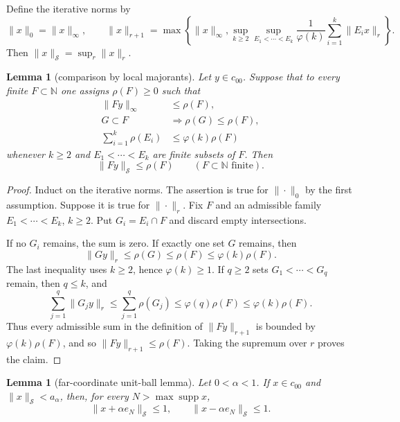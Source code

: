 \documentclass[11pt]{article}
\newtheorem{lemma}[theorem]{Lemma}
\newcommand{\N}{\mathbb N}
\newcommand{\ph}{\varphi}
\DeclareMathOperator{\supp}{supp}
\begin{document}
Define the iterative norms by
\[
 \|x\|_0=\|x\|_\infty,\qquad
 \|x\|_{r+1}=
 \max\left\{\|x\|_\infty,
 \sup_{k\ge 2}\sup_{E_1<\cdots<E_k}
 \frac1{\ph(k)}\sum_{i=1}^k\|E_i x\|_r\right\}.
\]
Then $\|x\|_{\mathcal S}=\sup_r\|x\|_r$.

\begin{lemma}[comparison by local majorants]\label{lem:comparison}
Let $y\in c_{00}$.  Suppose that to every finite $F\subset\N$ one assigns
$\rho(F)\ge 0$ such that
\begin{align*}
 \|Fy\|_\infty&\le \rho(F),\\
 G\subset F&\Longrightarrow \rho(G)\le \rho(F),\\
 \sum_{i=1}^k\rho(E_i)&\le \ph(k)\rho(F)
\end{align*}
whenever $k\ge 2$ and $E_1<\cdots<E_k$ are finite subsets of $F$.  Then
\[
 \|Fy\|_{\mathcal S}\le \rho(F)
 \qquad(F\subset\N\text{ finite}).
\]
\end{lemma}

\begin{proof}
Induct on the iterative norms.  The assertion is true for $\|\cdot\|_0$
by the first assumption.  Suppose it is true for $\|\cdot\|_r$.
Fix $F$ and an admissible family $E_1<\cdots<E_k$, $k\ge 2$.  Put
$G_i=E_i\cap F$ and discard empty intersections.

If no $G_i$ remains, the sum is zero.  If exactly one set $G$ remains, then
\[
 \|Gy\|_r\le \rho(G)\le\rho(F)\le \ph(k)\rho(F).
\]
The last inequality uses $k\ge 2$, hence $\ph(k)\ge 1$.
If $q\ge 2$ sets $G_1<\cdots<G_q$ remain, then $q\le k$, and
\[
 \sum_{j=1}^q\|G_jy\|_r
 \le
 \sum_{j=1}^q\rho(G_j)
 \le
 \ph(q)\rho(F)
 \le
 \ph(k)\rho(F).
\]
Thus every admissible sum in the definition of $\|Fy\|_{r+1}$ is bounded
by $\ph(k)\rho(F)$, and so $\|Fy\|_{r+1}\le\rho(F)$.  Taking the supremum
over $r$ proves the claim.
\end{proof}

\begin{lemma}[far-coordinate unit-ball lemma]\label{lem:far}
Let $0<\alpha<1$.  If $x\in c_{00}$ and
$\|x\|_{\mathcal S}<a_\alpha$, then, for every $N>\max\supp x$,
\[
 \|x+\alpha e_N\|_{\mathcal S}\le 1,
 \qquad
 \|x-\alpha e_N\|_{\mathcal S}\le 1.
\]
\end{lemma}
\end{document}
